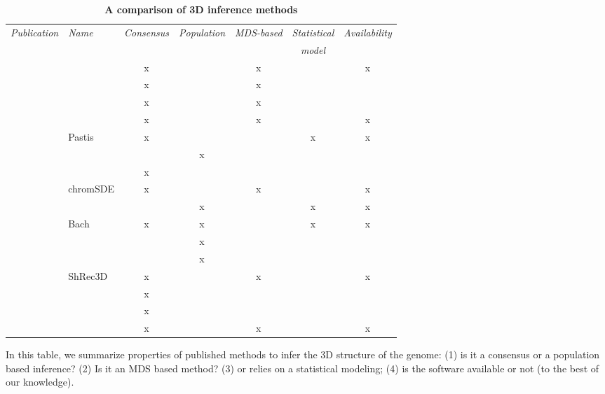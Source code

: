 \begin{table}[ht!]
\begin{center}
\small
\begin{tabular}{rlccccc}
\hline
\multirow{2}{*}{\emph{\footnotesize Publication}} & \multirow{2}{*}{\emph{\footnotesize Name}} &
\multirow{2}{*}{\emph{\footnotesize Consensus}} & \multirow{2}{*}{\emph{\footnotesize Population}}
&\multirow{2}{*}{\emph{\footnotesize MDS-based}} & \emph{\footnotesize Statistical} &
\multirow{2}{*}{\emph{\footnotesize Availability}} \\
& & & & & \emph{\footnotesize model} & \\
\hline
\footnotesize{\citet{duan:three-dimensional}} &  & x & & x & & x \\
\footnotesize{\citet{tanizawa:mapping}} & & x & & x & & \\
\footnotesize{\citet{ay:three-dimensional}} & & x & & x & & \\
\footnotesize{\citet{ben-elazar:spatial}} & & x & & x & & x \\
\footnotesize{\citet{varoquaux:statistical}} & Pastis & x & & & x & x\\
\footnotesize{\citet{bau:three-dimensional}} & & & x & & & \\
\footnotesize{\citet{umbarger:three-dimensional}} & & x & & & &\\
\footnotesize{\citet{zhang:inference}} & chromSDE & x & & x & & x\\
\footnotesize{\citet{rousseau:three}} & & & x & & x & x\\
\footnotesize{\citet{hu:bayesian}} & Bach & x & x & & x & x\\
\footnotesize{\citet{kalhor:genome}} & & & x & & &\\
\footnotesize{\citet{wong:predictive}} & & & x & & & \\
\footnotesize{\citet{lesne:3d}} & ShRec3D & x & & x & & x \\
\footnotesize{\citet{trieu:large}} & & x & & & & \\
\footnotesize{\citet{nagano:single-cell}} & & x & & & & \\
\footnotesize{\citet{paulsen:manifold}} & & x & & x & & x \\
\end{tabular}
\end{center}
\caption{\bf A comparison of 3D inference methods}{In this table, we summarize
properties of published methods to infer the 3D structure of the genome: (1)
is it a consensus or a population based inference? (2) Is it an MDS based
method? (3) or relies on a statistical modeling; (4) is the software
available or not (to the best of our knowledge).}
\end{table}


